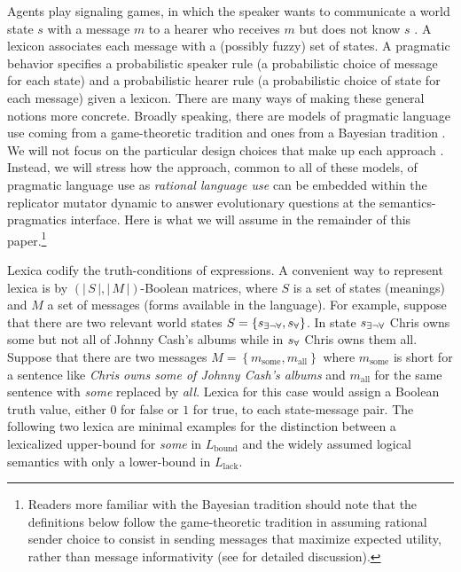 \documentclass[a4paper, 11pt]{article}
\theoremstyle{Satz}
\newcommand{\set}[1]{\left\{#1\right\}}
\newcommand{\card}[1]{\left \lvert \, #1 \, \right\rvert}
\newcommand{\States}{\ensuremath{S}\xspace}		%
\newcommand{\state}{\ensuremath{s}\xspace}		%
\newcommand{\mystate}[1]{\ensuremath{\state_{\text{#1}}}\xspace} %
\newcommand{\mylang}[1]{\ensuremath{L_{\text{#1}}}\xspace} %
\newcommand{\Messgs}{\ensuremath{M}\xspace}		%
\newcommand{\messg}{\ensuremath{m}\xspace}		%
\newcommand{\mymessg}[1]{\ensuremath{\messg_{\text{#1}}}\xspace} %
\newcommand{\ssome}{\mystate{\ensuremath{\exists\neg\forall}}}
\newcommand{\sall}{\mystate{\ensuremath{\forall}}}
\newcommand{\msome}{\mymessg{some}}
\newcommand{\mall}{\mymessg{all}}
\newcommand{\Lbound}{\mylang{bound}}
\newcommand{\Llack}{\mylang{lack}}
\begin{document}
Agents play signaling games, in which the speaker wants to communicate a world state $s$ with a
message $m$ to a hearer who receives $m$ but does not know $s$
\citep[e.g.][]{lewis:1969,Skyrms2010:Signals}. A lexicon associates each message with a
(possibly fuzzy) set of states. A pragmatic behavior specifies a probabilistic speaker
rule (a probabilistic choice of message for each state) and a probabilistic hearer rule (a
probabilistic choice of state for each message) given a lexicon. There are many ways of making these general notions more concrete. Broadly speaking, there are models of pragmatic language use coming from a game-theoretic tradition \citep[e.g.,][]{benz:2006,benz+vRooij:2007,jaeger:2007b,franke+jaeger:2014} and ones from a Bayesian tradition \citep[e.g.,][]{frank+goodman:2012,goodman+stuhlmueller:2013,GoodmanFrank2016:Pragmatic-Langu}. We will not focus on the particular design choices that make up each approach \citep{qing+franke:2015}. Instead, we will stress how the approach, common to all of these models, of pragmatic language use as {\em rational language use} can be embedded within the replicator mutator dynamic to answer evolutionary questions at the semantics-pragmatics interface. Here is what we will assume in the remainder of this paper.\footnote{Readers more familiar with the Bayesian tradition should note that the definitions below follow the game-theoretic tradition in assuming rational sender choice to consist in sending messages that maximize expected utility, rather than message informativity (see \citealt{qing+franke:2015} for detailed discussion).}

Lexica codify the truth-conditions of expressions. A convenient way to represent lexica is by
$(\card{\States}, \card{\Messgs})$-Boolean matrices, where $\States$ is a set of states
(meanings) and $M$ a set of messages (forms available in the language). For example, suppose
that there are two relevant world states $\States = \set{\ssome, \sall}$. In state $\ssome$
Chris owns some but not all of Johnny Cash's albums while in $\sall$ Chris owns them
all. Suppose that there are two messages $\Messgs = \set{\msome, \mall}$ where $\msome$ is
short for a sentence like \emph{Chris owns some of Johnny Cash's albums} and $\mall$ for the
same sentence with \emph{some} replaced by \emph{all}.  Lexica for this case would assign a
Boolean truth value, either $0$ for false or $1$ for true, to each state-message pair. The
following two lexica are minimal examples for the distinction between a lexicalized upper-bound
for \emph{some} in $\Lbound$ and the widely assumed logical semantics with only a lower-bound
in $\Llack$.
\end{document}
